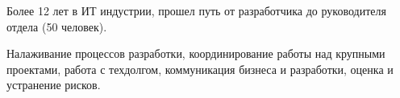 
\begin{cvparagraph}
    Более 12 лет в ИТ индустрии, прошел путь от разработчика до руководителя отдела (50 человек).

    Налаживание процессов разработки, координирование работы над крупными проектами, работа с техдолгом, коммуникация бизнеса и разработки, оценка и устранение рисков.
\end{cvparagraph}